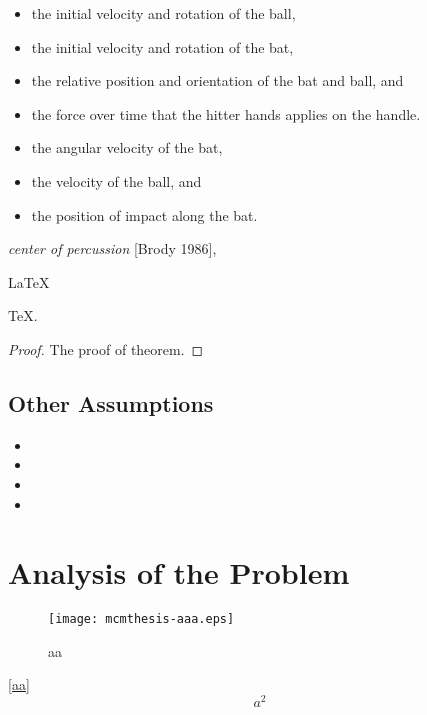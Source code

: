 \documentclass{mcmthesis}
\begin{document}
\begin{itemize}
\item the initial velocity and rotation of the ball,
\item the initial velocity and rotation of the bat,
\item the relative position and orientation of the bat and ball, and
\item the force over time that the hitter hands applies on the handle.
\end{itemize}
\lipsum[3]
\begin{itemize}
\item the angular velocity of the bat,
\item the velocity of the ball, and
\item the position of impact along the bat.
\end{itemize}
\lipsum[4]
\emph{center of percussion} [Brody 1986], \lipsum[5]

\begin{Theorem} \label{thm:latex}
\LaTeX
\end{Theorem}
\begin{Lemma} \label{thm:tex}
\TeX .
\end{Lemma}
\begin{proof}
The proof of theorem.
\end{proof}

\subsection{Other Assumptions}
\lipsum[6]
\begin{itemize}
\item
\item
\item
\item
\end{itemize}

\lipsum[7]

\section{Analysis of the Problem}
\begin{figure}[h]
\small
\centering
\texttt{[image: mcmthesis-aaa.eps]}
\caption{aa} \label{fig:aa}
\end{figure}

\lipsum[8] \eqref{aa}
\begin{equation}
a^2 \label{aa}
\end{equation}
\end{document}
